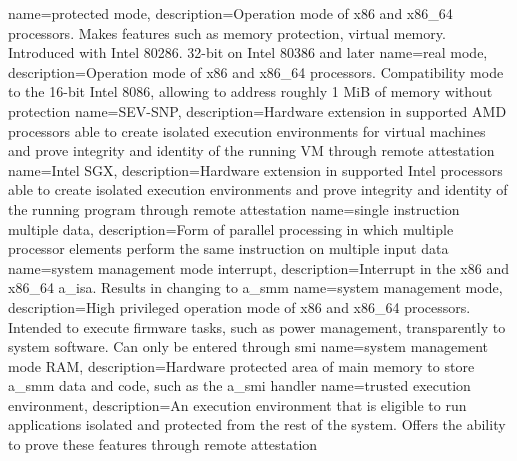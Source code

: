 %
{
    name=protected mode,
    description={Operation mode of x86 and x86\_64 processors. Makes features such as memory protection, virtual memory.
            Introduced with Intel 80286. 32-bit on Intel 80386 and later}
}
%
{
    name=real mode,
    description={Operation mode of x86 and x86\_64 processors. Compatibility mode to the 16-bit Intel 8086, allowing to
            address roughly 1 MiB of memory without protection}
}
%
{
    name=SEV-SNP,
    description={Hardware extension in supported AMD processors able to create isolated execution environments for
            virtual machines and prove integrity and identity of the running VM through remote attestation}
}
{
    name=Intel SGX,
    description={Hardware extension in supported Intel processors able to create isolated execution environments and
            prove integrity and identity of the running program through remote attestation}
}
{
    name={single instruction multiple data},
    description={Form of parallel processing in which multiple processor elements perform the same instruction on
            multiple input data}
}
{
    name=system management mode interrupt,
    description={Interrupt in the x86 and x86\_64 \acrshort{a_isa}. Results in changing to \acrshort{a_smm}}
}
{
    name=system management mode,
    description={High privileged operation mode of x86 and x86\_64 processors. Intended to execute firmware tasks, such
            as power management, transparently to system software. Can only be entered through \acrshort{smi}}
}
{
    name=system management mode RAM,
    description={Hardware protected area of main memory to store \acrshort{a_smm} data and code, such as the
            \acrshort{a_smi} handler}
}
%
{
    name=trusted execution environment,
    description={An execution environment that is eligible to run applications isolated and protected from the rest of
            the system. Offers the ability to prove these features through remote attestation}
}
